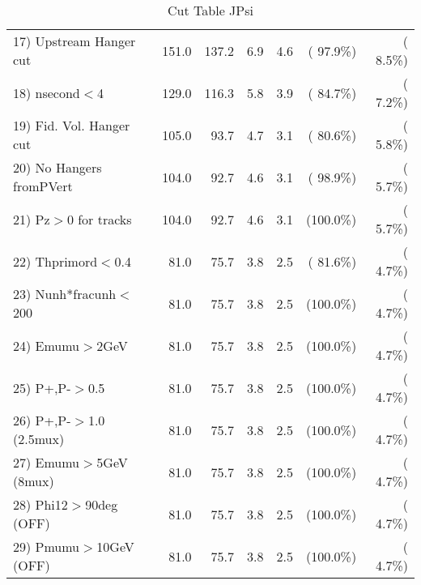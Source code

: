 \begin{table}[h!]
\begin{tabular}{||l||r|r|r|r|r|r||}
 17) Upstream Hanger cut  &        151.0 &        137.2 &          6.9 &          4.6 & ( 97.9\%) & (  8.5\%) \\
 18) nsecond$<$4          &        129.0 &        116.3 &          5.8 &          3.9 & ( 84.7\%) & (  7.2\%) \\
 19) Fid. Vol. Hanger cut &        105.0 &         93.7 &          4.7 &          3.1 & ( 80.6\%) & (  5.8\%) \\
 20) No Hangers fromPVert &        104.0 &         92.7 &          4.6 &          3.1 & ( 98.9\%) & (  5.7\%) \\
 21) Pz$>$0 for tracks    &        104.0 &         92.7 &          4.6 &          3.1 & (100.0\%) & (  5.7\%) \\
 22) Thprimord$<$0.4      &         81.0 &         75.7 &          3.8 &          2.5 & ( 81.6\%) & (  4.7\%) \\
 23) Nunh*fracunh$<$200   &         81.0 &         75.7 &          3.8 &          2.5 & (100.0\%) & (  4.7\%) \\
 24) Emumu$>$2GeV         &         81.0 &         75.7 &          3.8 &          2.5 & (100.0\%) & (  4.7\%) \\
 25) P+,P-$>$0.5          &         81.0 &         75.7 &          3.8 &          2.5 & (100.0\%) & (  4.7\%) \\
 26) P+,P-$>$1.0 (2.5mux) &         81.0 &         75.7 &          3.8 &          2.5 & (100.0\%) & (  4.7\%) \\
 27) Emumu$>$5GeV  (8mux) &         81.0 &         75.7 &          3.8 &          2.5 & (100.0\%) & (  4.7\%) \\
 28) Phi12$>$90deg  (OFF) &         81.0 &         75.7 &          3.8 &          2.5 & (100.0\%) & (  4.7\%) \\
 29) Pmumu$>$10GeV  (OFF) &         81.0 &         75.7 &          3.8 &          2.5 & (100.0\%) & (  4.7\%) \\
 \hline
 \hline
 \end{tabular}
 \caption{Cut Table  JPsi     }
 \label{tab-cutcohjpsi-mumu_cohrhop}
 \end{table}
